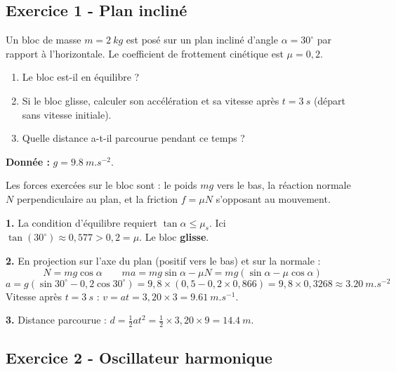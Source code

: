 \documentclass[12pt,a4paper]{article}
\begin{document}
\subsection*{Exercice 1 - Plan incliné \niveau{\facile}}

\begin{boiteexercice}
Un bloc de masse $m = \qty{2}{kg}$ est posé sur un plan incliné d'angle $\alpha = 30^\circ $ par rapport à l'horizontale. Le coefficient de frottement cinétique est $\mu = 0{,}2$.
\begin{enumerate}
  \item Le bloc est-il en équilibre ?
  \item Si le bloc glisse, calculer son accélération et sa vitesse après $t = \qty{3}{s}$ (départ sans vitesse initiale).
  \item Quelle distance a-t-il parcourue pendant ce temps ?
\end{enumerate}
\textbf{Donnée :} $g = \qty{9.8}{m.s^{-2}}$.
\end{boiteexercice}

\begin{boitecorrige}
Les forces exercées sur le bloc sont : le poids $mg$ vers le bas, la réaction normale $N$ perpendiculaire au plan, et la friction $f = \mu N$ s'opposant au mouvement.

\textbf{1.} La condition d'équilibre requiert $\tan\alpha \leq \mu_s$. Ici $\tan(30^\circ ) \approx 0{,}577 > 0{,}2 = \mu$. Le bloc \textbf{glisse}.

\textbf{2.} En projection sur l'axe du plan (positif vers le bas) et sur la normale :
\[
N = mg\cos\alpha \qquad ma = mg\sin\alpha - \mu N = mg(\sin\alpha - \mu\cos\alpha)
\]
\[
a = g(\sin30^\circ  - 0{,}2\cos30^\circ ) = 9{,}8\times(0{,}5 - 0{,}2\times0{,}866) = 9{,}8\times0{,}3268 \approx \qty{3.20}{m.s^{-2}}
\]
Vitesse après $t = \qty{3}{s}$ : $v = at = 3{,}20\times3 = \qty{9.61}{m.s^{-1}}$.

\textbf{3.} Distance parcourue : $d = \frac{1}{2}at^2 = \frac{1}{2}\times3{,}20\times9 = \qty{14.4}{m}$.
\end{boitecorrige}

\subsection*{Exercice 2 - Oscillateur harmonique \niveau{\moyen}}
\end{document}
